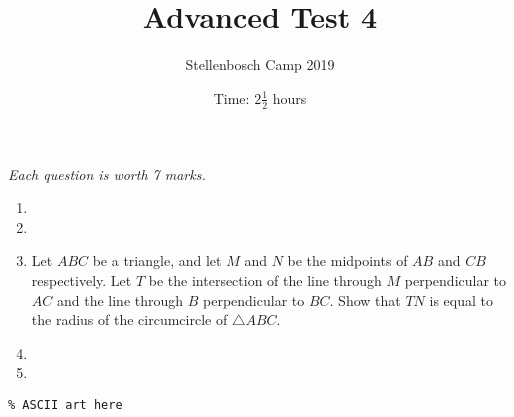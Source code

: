 \documentclass{article}
\title{Advanced Test 4}
\author{Stellenbosch Camp 2019}
\date{Time: $2\frac{1}{2}$ hours}
\begin{document}
\maketitle
\thispagestyle{empty}

\hfill\textit{Each question is worth 7 marks.}

\vfill
\vfill


\begin{enumerate}[1.]

\item %


\vfill

\item %


\vfill

\item %
Let $ABC$ be a triangle, and let $M$ and $N$ be the midpoints of $AB$ and $CB$ respectively.
Let $T$ be the intersection of the line through $M$ perpendicular to $AC$ and the line through $B$ perpendicular to $BC$.
Show that $TN$ is equal to the radius of the circumcircle of $\triangle ABC$.


\vfill

\item %


\vfill

\item %


\end{enumerate}


\vfill
\vfill
\begin{center}
\begin{BVerbatim}
\end{BVerbatim}
\end{center}
\end{document}
